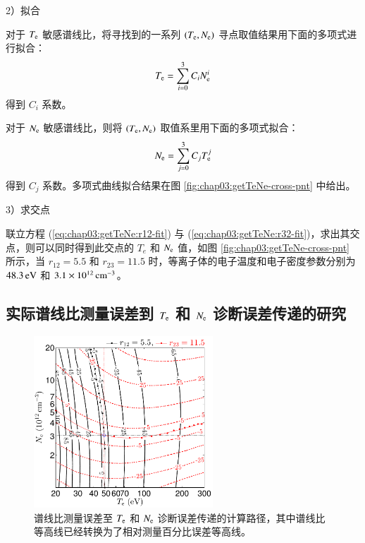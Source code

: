 2）拟合

对于 $T_{\rm e}$ 敏感谱线比，将寻找到的一系列 $(T_{\rm e}, N_{\rm e})$ 寻点取值结果用下面的多项式进行拟合：
\begin{equation}
    \label{eq:chap03:getTeNe:r12-fit}
    T_{\rm e} = \sum_{i=0}^{3}C_{i}N_{\rm e}^{i}
\end{equation}
得到 $C_i$ 系数。

对于 $N_{\rm e}$ 敏感谱线比，则将 $(T_{\rm e}, N_{\rm e})$ 取值系里用下面的多项式拟合：
\begin{equation}
    \label{eq:chap03:getTeNe:r32-fit}
    N_{\rm e} = \sum_{j=0}^{3}C_{j}T_{\rm e}^{j}
\end{equation}
得到 $C_j$ 系数。多项式曲线拟合结果在图 \ref{fig:chap03:getTeNe-cross-pnt} 中给出。

3）求交点

联立方程 (\ref{eq:chap03:getTeNe:r12-fit}) 与 (\ref{eq:chap03:getTeNe:r32-fit})，求出其交点，则可以同时得到此交点的 $T_{e}$ 和 $N_{\rm e}$ 值，如图 \ref{fig:chap03:getTeNe-cross-pnt} 所示，当 $r_{12}=5.5$ 和 $r_{23}=11.5$ 时，等离子体的电子温度和电子密度参数分别为 $48.3\,{\rm eV}$ 和 $3.1\times10^{12}\,{\rm cm}^{-3}$。

\subsection{实际谱线比测量误差到 $T_{\rm e}$ 和 $N_{\rm e}$ 诊断误差传递的研究}
\label{sec:chap03:lineratio-error-to-result-error}

\begin{figure}%
  \centering
  \includegraphics[width=0.6\textwidth]{6-9to7-7to5-getTeNe-errorroute.pdf}
  \caption{谱线比测量误差至 $T_{\rm e}$ 和 $N_{\rm e}$ 诊断误差传递的计算路径，其中谱线比等高线已经转换为了相对测量百分比误差等高线。}
  \label{fig:chap03:getTeNe-error-route}
\end{figure}

